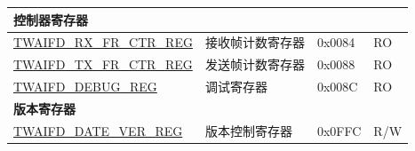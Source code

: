 \begin{longtable}{ | p{6cm} | p{7.2cm} | p{1.3cm} | p{1.5cm} | }
\multicolumn{4}{|l|}{\textbf{控制器寄存器}} \\ \hline
\hyperref[regdesc:TWAIFDRXFRCTRREG]{TWAIFD\_RX\_FR\_CTR\_REG} & 接收帧计数寄存器 & 0x0084 & RO \\ \hline
\hyperref[regdesc:TWAIFDTXFRCTRREG]{TWAIFD\_TX\_FR\_CTR\_REG} & 发送帧计数寄存器 & 0x0088 & RO \\ \hline
\hyperref[regdesc:TWAIFDDEBUGREG]{TWAIFD\_DEBUG\_REG} & 调试寄存器 & 0x008C & RO \\ \hline
\multicolumn{4}{|l|}{\textbf{版本寄存器}} \\ \hline
\hyperref[regdesc:TWAIFDDATEVERREG]{TWAIFD\_DATE\_VER\_REG} & 版本控制寄存器 & 0x0FFC & R/W \\ \hline
\end{longtable}
